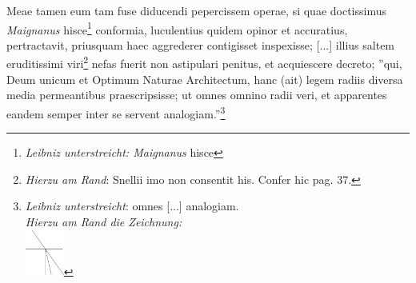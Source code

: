  \pstart [p.~21] Meae tamen eum tam fuse diducendi pepercissem operae, si quae doctissimus \textit{Maignanus}\protect{} hisce\footnote{\textit{Leibniz unterstreicht: Maignanus}\protect{} hisce} conformia, luculentius quidem opinor et accuratius, pertractavit, priusquam haec aggrederer contigisset inspexisse; [...] illius saltem eruditissimi viri\footnote{\textit{Hierzu am Rand}: Snellii\protect{} imo non consentit his. Confer hic pag. 37.} nefas fuerit non astipulari penitus, et acquiescere decreto; ''qui,
 \pend 
 \newpage 
 \pstart \noindent Deum unicum et Optimum Naturae Architectum, hanc (ait) legem radiis\protect{} diversa media permeantibus praescripsisse; ut omnes omnino radii\protect{} veri, et apparentes eandem semper inter se servent analogiam.''\footnote{\textit{Leibniz unterstreicht}: omnes [...] analogiam.\\ \textit{Hierzu am Rand die Zeichnung:}\\\protect\includegraphics[width=0.1\textwidth]{images/Barrow_21}}
 \pend